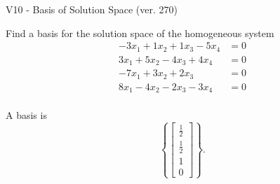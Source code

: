 \begin{exercise}
  \begin{exerciseTitle}V10 - Basis of Solution Space (ver. 270)\end{exerciseTitle}
  \begin{exerciseStatement}
    Find a basis for the solution space of the homogeneous system 
\begin{align*}
 -3 x_ 1 + 1 x_ 2 + 1 x_ 3 -5 x_ 4 &= 0  \\ 
  3 x_ 1 + 5 x_ 2 -4 x_ 3 + 4 x_ 4 &= 0  \\ 
  -7 x_ 1 + 3 x_ 2 + 2 x_ 3 &= 0  \\ 
  8 x_ 1 -4 x_ 2 -2 x_ 3 -3 x_ 4 &= 0  \\ 
 \end{align*}


 
  \end{exerciseStatement}

  \begin{exerciseAnswer}
   A basis is   
\[\left\{\left[\begin{array}{c}
\frac{1}{2} \\
\frac{1}{2} \\
1 \\
0
\end{array}\right]\right\}.\]

  


  \end{exerciseAnswer}
\end{exercise}